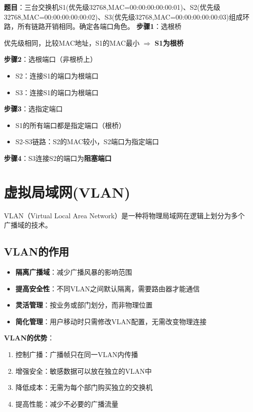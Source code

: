 \documentclass[12pt,a4paper,openany]{ctexbook}
\begin{document}
\begin{examplebox}[例题3.6 STP端口角色]
\textbf{题目}：三台交换机S1(优先级32768,MAC=00:00:00:00:00:01)、S2(优先级32768,MAC=00:00:00:00:00:02)、S3(优先级32768,MAC=00:00:00:00:00:03)组成环路，所有链路开销相同。确定各端口角色。
\tcblower
\textbf{步骤1}：选根桥

优先级相同，比较MAC地址，S1的MAC最小 $\Rightarrow$ \textbf{S1为根桥}

\textbf{步骤2}：选根端口（非根桥上）
\begin{itemize}[itemsep=0pt]
    \item S2：连接S1的端口为根端口
    \item S3：连接S1的端口为根端口
\end{itemize}

\textbf{步骤3}：选指定端口
\begin{itemize}[itemsep=0pt]
    \item S1的所有端口都是指定端口（根桥）
    \item S2-S3链路：S2的MAC较小，S2端口为指定端口
\end{itemize}

\textbf{步骤4}：S3连接S2的端口为\textbf{阻塞端口}
\end{examplebox}

\section{虚拟局域网(VLAN)}
VLAN（Virtual Local Area Network）是一种将物理局域网在逻辑上划分为多个广播域的技术。

\subsection{VLAN的作用}
\begin{itemize}[leftmargin=2em,itemsep=0pt]
    \item \textbf{隔离广播域}：减少广播风暴的影响范围
    \item \textbf{提高安全性}：不同VLAN之间默认隔离，需要路由器才能通信
    \item \textbf{灵活管理}：按业务或部门划分，而非物理位置
    \item \textbf{简化管理}：用户移动时只需修改VLAN配置，无需改变物理连接
\end{itemize}

\textbf{VLAN的优势}：
\begin{enumerate}[leftmargin=2em,itemsep=0pt]
    \item 控制广播：广播帧只在同一VLAN内传播
    \item 增强安全：敏感数据可以放在独立的VLAN中
    \item 降低成本：无需为每个部门购买独立的交换机
    \item 提高性能：减少不必要的广播流量
\end{enumerate}
\end{document}
